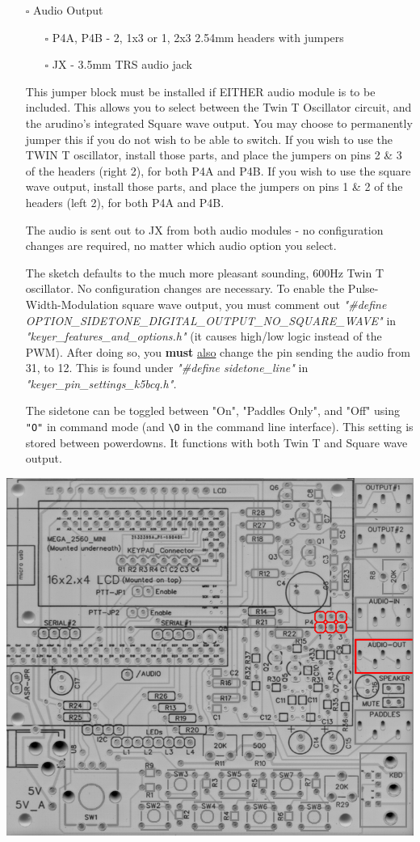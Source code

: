 \documentclass[11pt]{article}
\begin{document}
\newpage
\begin{itemize}
\item[{$\square$}] Audio Output
\begin{itemize}
\item[{$\square$}] P4A, P4B - 2, 1x3 or 1, 2x3 2.54mm headers with jumpers
\item[{$\square$}] JX - 3.5mm TRS audio jack
\end{itemize}

This jumper block must be installed if EITHER audio module is to be included.  This allows you to select between the Twin T Oscillator circuit, and the arudino's integrated Square wave output.  You may choose to permanently jumper this if you do not wish to be able to switch.  If you wish to use the TWIN T oscillator, install those parts, and place the jumpers on pins 2 \& 3 of the headers (right 2), for both P4A and P4B.  If you wish to use the square wave output, install those parts, and place the jumpers on pins 1 \& 2 of the headers (left 2), for both P4A and P4B.

The audio is sent out to JX from both audio modules - no configuration changes are required, no matter which audio option you select.

The sketch defaults to the much more pleasant sounding, 600Hz Twin T oscillator.  No configuration changes are necessary.  To enable the Pulse-Width-Modulation square wave output, you must comment out \emph{"\#define OPTION\_SIDETONE\_DIGITAL\_OUTPUT\_NO\_SQUARE\_WAVE"} in \emph{"keyer\_features\_and\_options.h"} (it causes high/low logic instead of the PWM).  After doing so, you \textbf{must} \uline{also} change the pin sending the audio from 31, to 12.  This is found under \emph{"\#define sidetone\_line"} in \emph{"keyer\_pin\_settings\_k5bcq.h".}

The sidetone can be toggled between "On", "Paddles Only", and "Off" using \texttt{"O"} in command mode (and \texttt{\textbackslash{}O} in the command line interface).  This setting is stored between powerdowns.  It functions with both Twin T and Square wave output.
\end{itemize}
\begin{center}
\includegraphics[width=.9\linewidth]{../png/3.3/pcb-top-audio-output.png}
\end{center}
\end{document}
